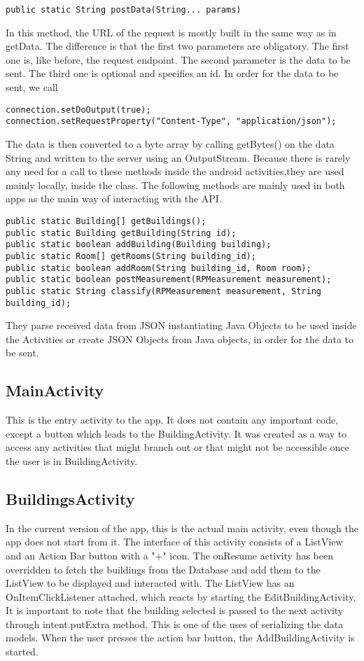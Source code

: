 \begin{lstlisting}
public static String postData(String... params)
\end{lstlisting}
In this method, the URL of the request is mostly built in the same way as in getData. The difference is that the first two parameters are obligatory. The first one is, like before, the request endpoint. The second parameter is the data to be sent. The third one is optional and specifies an id. 
In order for the data to be sent, we call
\begin{lstlisting}
connection.setDoOutput(true);
connection.setRequestProperty("Content-Type", "application/json");
\end{lstlisting}
The data is then converted to a byte array by calling getBytes() on the data String and written to the server using an OutputStream.
Because there is rarely any need for a call to these methods inside the android activities,they are used mainly locally, inside the class. The following methods are mainly used in both apps as the main way of interacting with the API.
\begin{lstlisting}
public static Building[] getBuildings();
public static Building getBuilding(String id);
public static boolean addBuilding(Building building);
public static Room[] getRooms(String building_id);
public static boolean addRoom(String building_id, Room room);
public static boolean postMeasurement(RPMeasurement measurement);
public static String classify(RPMeasurement measurement, String building_id);
\end{lstlisting}
They parse received data from JSON instantiating Java Objects to be used inside the Activities or create JSON Objects from Java objects, in order for the data to be sent.

\subsection{MainActivity}
This is the entry activity to the app. It does not contain any important code, except a button which leads to the BuildingActivity. It was created as a way to access any activities that might branch out or that might not be accessible once the user is in BuildingActivity.

\subsection{BuildingsActivity}
In the current version of the app, this is the actual main activity, even though the app does not start from it.
The interface of this activity consists of a ListView and an Action Bar button with a "+" icon. 
The onResume activity has been overridden to fetch the buildings from the Database and add them to the ListView to be displayed and interacted with. The ListView has an OnItemClickListener attached, which reacts by starting the EditBuildingActivity. It is important to note that the building selected is passed to the next activity through intent.putExtra method. This is one of the uses of serializing the data models. When the user presses the action bar button, the AddBuildingActivity is started.

